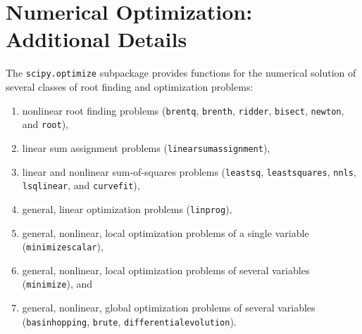 \documentclass[fleqn,10pt]{wlscirep}
\begin{document}
\section*{Numerical Optimization: Additional Details}
The \texttt{scipy.optimize} subpackage provides functions for the numerical solution of several classes of root finding and optimization problems:
\begin{enumerate}
\item nonlinear root finding problems (\texttt{brentq}, \texttt{brenth}, \texttt{ridder}, \texttt{bisect}, \texttt{newton}, and \texttt{root}),
\item linear sum assignment problems (\texttt{linear\textunderscore sum\textunderscore assignment}),
\item linear and nonlinear sum-of-squares problems (\texttt{leastsq}, \texttt{least\textunderscore squares}, \texttt{nnls}, \texttt{lsq\textunderscore linear}, and \texttt{curve\textunderscore fit}),
\item general, linear optimization problems (\texttt{linprog}),
\item general, nonlinear, local optimization problems of a single variable (\texttt{minimize\textunderscore scalar}),
\item general, nonlinear, local optimization problems of several variables (\texttt{minimize}), and
\item general, nonlinear, global optimization problems of several variables (\texttt{basinhopping}, \texttt{brute}, \texttt{differential\textunderscore evolution}).
\end{enumerate}
\end{document}
